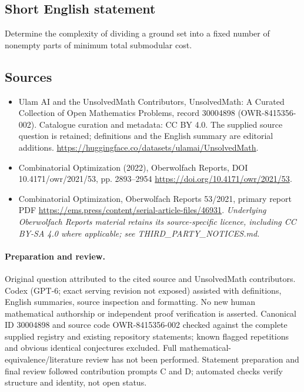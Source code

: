 \documentclass[11pt]{article}
\begin{document}
\subsection{Short English statement}
Determine the complexity of dividing a ground set into a fixed number of nonempty parts of minimum total submodular cost.
\subsection{Sources}
\begin{itemize}
\item[\hypertarget{source:30004898:1}{S1}] Ulam AI and the UnsolvedMath Contributors, UnsolvedMath: A Curated Collection of Open Mathematics Problems, record 30004898 (OWR-8415356-002). Catalogue curation and metadata: CC BY 4.0. The supplied source question is retained; definitions and the English summary are editorial additions.
\url{https://huggingface.co/datasets/ulamai/UnsolvedMath}.
\item[\hypertarget{source:30004898:2}{S2}] Combinatorial Optimization (2022), Oberwolfach Reports, DOI 10.4171/owr/2021/53, pp. 2893--2954
\url{https://doi.org/10.4171/owr/2021/53}.
\item[\hypertarget{source:30004898:3}{S3}] Combinatorial Optimization, Oberwolfach Reports 53/2021, primary report PDF
\url{https://ems.press/content/serial-article-files/46931}.
\textit{Underlying Oberwolfach Reports material retains its source-specific licence, including CC BY-SA 4.0 where applicable; see THIRD\_PARTY\_NOTICES.md.}
\end{itemize}
\paragraph{Preparation and review.}
Original question attributed to the cited source and UnsolvedMath contributors. Codex (GPT-6; exact serving revision not exposed) assisted with definitions, English summaries, source inspection and formatting. No new human mathematical authorship or independent proof verification is asserted. Canonical ID 30004898 and source code OWR-8415356-002 checked against the complete supplied registry and existing repository statements; known flagged repetitions and obvious identical conjectures excluded. Full mathematical-equivalence/literature review has not been performed. Statement preparation and final review followed contribution prompts C and D; automated checks verify structure and identity, not open status.
\label{end:30004898}
\end{document}

